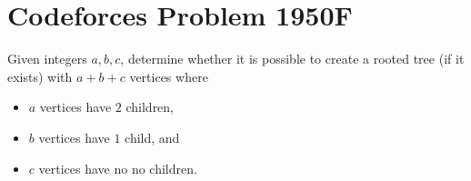 \documentclass[a4paper, 12pt]{article}
\begin{document}
\section*{Codeforces Problem 1950F}

\begin{chirpbox}
    \begin{problem}
        Given integers \( a, b, c \), determine whether it is possible to create a rooted tree (if it exists) with \( a + b + c \) vertices where
        \begin{itemize}[itemsep=0pt]
            \item \( a \) vertices have \( 2 \) children,
            \item \( b \) vertices have \( 1 \) child, and
            \item \( c \) vertices have no no children.
        \end{itemize}
    \end{problem}
\end{chirpbox}
\end{document}
